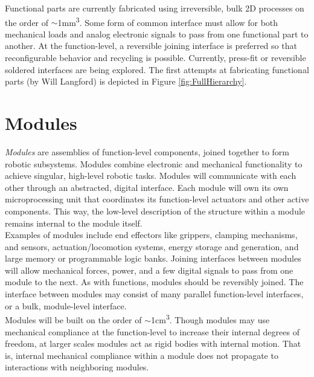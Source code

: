 {Functional parts are currently fabricated using irreversible, bulk 2D processes on the order of $\sim$1mm\textsuperscript{3}.  Some form of common interface must allow for both mechanical loads and analog electronic signals to pass from one functional part to another.  At the function-level, a reversible joining interface is preferred so that reconfigurable behavior and recycling is possible.  Currently, press-fit or reversible soldered interfaces are being explored.  The first attempts at fabricating functional parts (by Will Langford) is depicted in Figure \ref{fig:FullHierarchy}.

\section{Modules}

\textit{Modules} are assemblies of function-level components, joined together to form robotic subsystems.  Modules combine electronic and mechanical functionality to achieve singular, high-level robotic tasks.  Modules will communicate with each other through an abstracted, digital interface.  Each module will own its own microprocessing unit that coordinates its function-level actuators and other active components.  This way, the low-level description of the structure within a module remains internal to the module itself.\\

Examples of modules include end effectors like grippers, clamping mechanisms, and sensors, actuation/locomotion systems, energy storage and generation, and large memory or programmable logic banks.  Joining interfaces between modules will allow mechanical forces, power, and a few digital signals to pass from one module to the next.  As with functions, modules should be reversibly joined.  The interface between modules may consist of many parallel function-level interfaces, or a bulk, module-level interface.\\

Modules will be built on the order of $\sim$1cm\textsuperscript{3}.  Though modules may use mechanical compliance at the function-level to increase their internal degrees of freedom, at larger scales modules act as rigid bodies with internal motion.  That is, internal mechanical compliance within a module does not propagate to interactions with neighboring modules.%

}
